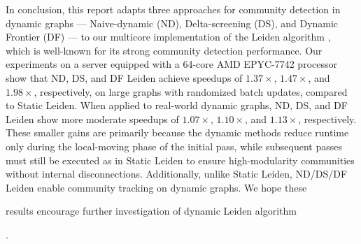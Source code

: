 In conclusion, this report adapts three approaches for community detection in dynamic graphs --- Naive-dynamic (ND), Delta-screening (DS), and Dynamic Frontier (DF) --- to our multicore implementation \cite{sahu2023gveleiden} of the Leiden algorithm \cite{com-traag19}, which is well-known for its strong community detection performance. Our experiments on a server equipped with a 64-core AMD EPYC-7742 processor show that ND, DS, and DF Leiden achieve speedups of $1.37\times$, $1.47\times$, and $1.98\times$, respectively, on large graphs with randomized batch updates, compared to Static Leiden. When applied to real-world dynamic graphs, ND, DS, and DF Leiden show more moderate speedups of $1.07\times$, $1.10\times$, and $1.13\times$, respectively. These smaller gains are primarily because the dynamic methods reduce runtime only during the local-moving phase of the initial pass, while subsequent passes must still be executed as in Static Leiden to ensure high-modularity communities without internal disconnections. Additionally, unlike Static Leiden, ND/DS/DF Leiden enable community tracking on dynamic graphs. We hope these results encourage further investigation of dynamic Leiden algorithm.
